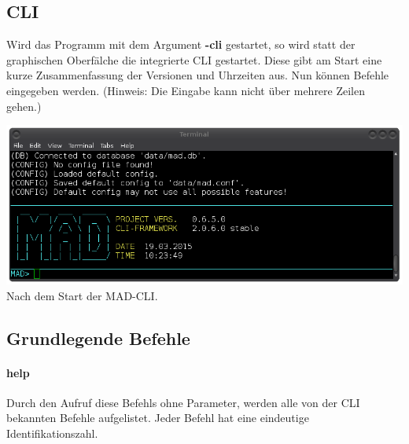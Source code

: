 \documentclass[12pt,a4paper]{report}
\begin{document}
\begin{onehalfspace}
\chapter{CLI}

Wird das Programm mit dem Argument \textbf{-cli} gestartet, so wird statt der graphischen Oberfälche die integrierte CLI gestartet. Diese gibt am Start eine kurze Zusammenfassung der Versionen und Uhrzeiten aus. Nun können Befehle eingegeben werden. (Hinweis: Die Eingabe kann nicht über mehrere Zeilen gehen.)\\

\begin{center}
\includegraphics[scale=0.5]{img/cli_mad.png}\\
Nach dem Start der MAD-CLI.
\end{center}

\section{Grundlegende Befehle}

\subsubsection{help}

Durch den Aufruf diese Befehls ohne Parameter, werden alle von der CLI bekannten Befehle aufgelistet. Jeder Befehl hat eine eindeutige Identifikationszahl.\\


\end{onehalfspace}
\end{document}
